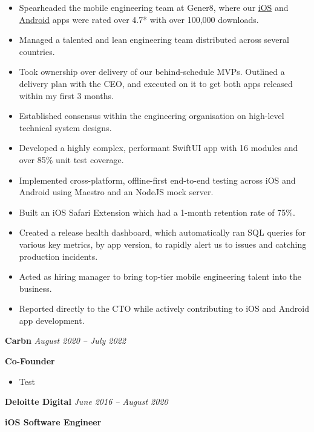 \documentclass[11pt, oneside]{article}
\begin{document}
\begin{itemize}
  \item Spearheaded the mobile engineering team at Gener8, where our \href{https://apps.apple.com/app/gener8-earn-from-your-data/id1586631181}{iOS} and \href{https://play.google.com/store/apps/details?id=com.gener8ads.wallet}{Android} apps were rated over 4.7* with over 100,000 downloads.
  \item Managed a talented and lean engineering team distributed across several countries.
  \item Took ownership over delivery of our behind-schedule MVPs. Outlined a delivery plan with the CEO, and executed on it to get both apps released within my first 3 months.
  \item Established consensus within the engineering organisation on high-level technical system designs.
  \item Developed a highly complex, performant SwiftUI app with 16 modules and over 85\% unit test coverage.
  \item Implemented cross-platform, offline-first end-to-end testing across iOS and Android using Maestro and an NodeJS mock server.
  \item Built an iOS Safari Extension which had a 1-month retention rate of 75\%.
  \item Created a release health dashboard, which automatically ran SQL queries for various key metrics, by app version, to rapidly alert us to issues and catching production incidents. 
  \item Acted as hiring manager to bring top-tier mobile engineering talent into the business.
  \item Reported directly to the CTO while actively contributing to iOS and Android app development.
\end{itemize}

\medskip

\textbf{Carbn}
\hfill
\textit{August 2020 – July 2022}

\textbf{Co-Founder}

\begin{itemize} 
  \item Test
\end{itemize}

\medskip

\textbf{Deloitte Digital}
\hfill
\textit{June 2016 – August 2020}
								 
\textbf{iOS Software Engineer}
\end{document}
